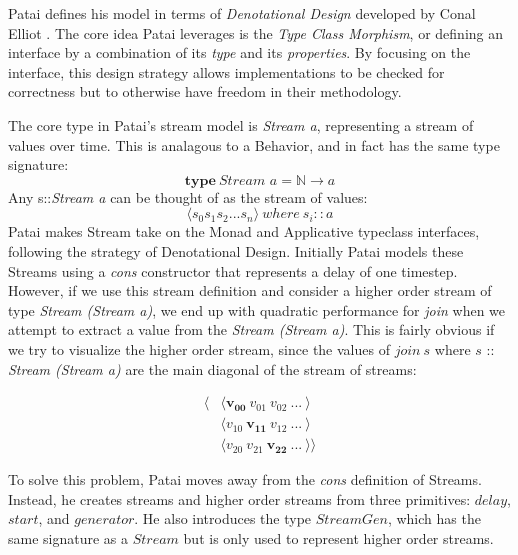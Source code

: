 \documentclass[twocolumn,11pt,english]{article}
\begin{document}
Patai defines his model in terms of \textit{Denotational Design} developed by Conal Elliot \cite{elliott2009denotational}. The core idea Patai leverages is the \textit{Type Class Morphism}, or defining an interface by a combination of its \textit{type} and its \textit{properties}. By focusing on the interface, this design strategy allows implementations to be checked for correctness but to otherwise have freedom in their methodology. 

The core type in Patai's stream model is \textit{Stream a}, representing a stream of values over time. This is analagous to a Behavior, and in fact has the same type signature: 
\begin{equation}
  \textbf{type}~\textit{Stream a} = \mathbb{N} \rightarrow a
\end{equation}
Any  s::\textit{Stream a} can be thought of as the stream of values:
\begin{equation}
  \langle s_0 s_1 s_2 ... s_n \rangle ~where~ s_i :: a
\end{equation}
Patai makes Stream take on the Monad and Applicative typeclass interfaces, following the strategy of Denotational Design. Initially Patai models these Streams using a \textit{cons} constructor that represents a delay of one timestep. However, if we use this stream definition and consider a higher order stream of type \textit{Stream (Stream a)}, we end up with quadratic performance for \textit{join} when we attempt to extract a value from the \textit{Stream (Stream a)}. This is fairly obvious if we try to visualize the higher order stream, since the values of $join~s$ where $s$ :: \textit{Stream (Stream a)} are the main diagonal of the stream of streams:

\begin{align*}
    \langle &\langle \mathbf{v_{00}} ~ v_{01} ~ v_{02} ~ ... ~ \rangle \\
    &\langle v_{10} ~ \mathbf{v_{11}} ~ v_{12} ~ ... ~ \rangle \\
    &\langle v_{20} ~ v_{21} ~ \mathbf{v_{22}} ~  ...  ~ \rangle \rangle
\end{align*}

To solve this problem, Patai moves away from the \textit{cons} definition of Streams. Instead, he creates streams and higher order streams from three primitives: $delay$, $start$, and $generator$. He also introduces the type $StreamGen$, which has the same signature as a $Stream$ but is only used to represent higher order streams. 
\end{document}
